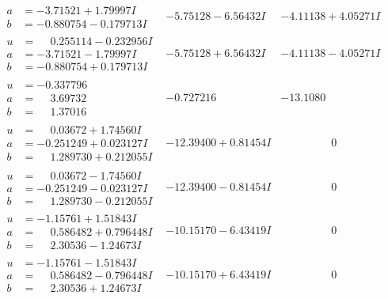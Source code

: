 \documentclass[1p]{elsarticle_modified}
\theoremstyle{definition}
\begin{document}
$$\begin{array}{c|c|c}
\begin{aligned}
a &= -3.71521 + 1.79997 I \\
b &= -0.880754 - 0.179713 I\end{aligned}
 & -5.75128 - 6.56432 I & -4.11138 + 4.05271 I \\ \hline\begin{aligned}
u &= \phantom{-}0.255114 - 0.232956 I \\
a &= -3.71521 - 1.79997 I \\
b &= -0.880754 + 0.179713 I\end{aligned}
 & -5.75128 + 6.56432 I & -4.11138 - 4.05271 I \\ \hline\begin{aligned}
u &= -0.337796\phantom{ +0.000000I} \\
a &= \phantom{-}3.69732\phantom{ +0.000000I} \\
b &= \phantom{-}1.37016\phantom{ +0.000000I}\end{aligned}
 & -0.727216\phantom{ +0.000000I} & -13.1080\phantom{ +0.000000I} \\ \hline\begin{aligned}
u &= \phantom{-}0.03672 + 1.74560 I \\
a &= -0.251249 + 0.023127 I \\
b &= \phantom{-}1.289730 + 0.212055 I\end{aligned}
 & -12.39400 + 0.81454 I & \phantom{-0.000000 } 0 \\ \hline\begin{aligned}
u &= \phantom{-}0.03672 - 1.74560 I \\
a &= -0.251249 - 0.023127 I \\
b &= \phantom{-}1.289730 - 0.212055 I\end{aligned}
 & -12.39400 - 0.81454 I & \phantom{-0.000000 } 0 \\ \hline\begin{aligned}
u &= -1.15761 + 1.51843 I \\
a &= \phantom{-}0.586482 + 0.796448 I \\
b &= \phantom{-}2.30536 - 1.24673 I\end{aligned}
 & -10.15170 - 6.43419 I & \phantom{-0.000000 } 0 \\ \hline\begin{aligned}
u &= -1.15761 - 1.51843 I \\
a &= \phantom{-}0.586482 - 0.796448 I \\
b &= \phantom{-}2.30536 + 1.24673 I\end{aligned}
 & -10.15170 + 6.43419 I & \phantom{-0.000000 } 0 \\ \hline\begin{aligned}

\end{aligned}
\end{array}$$
\end{document}
